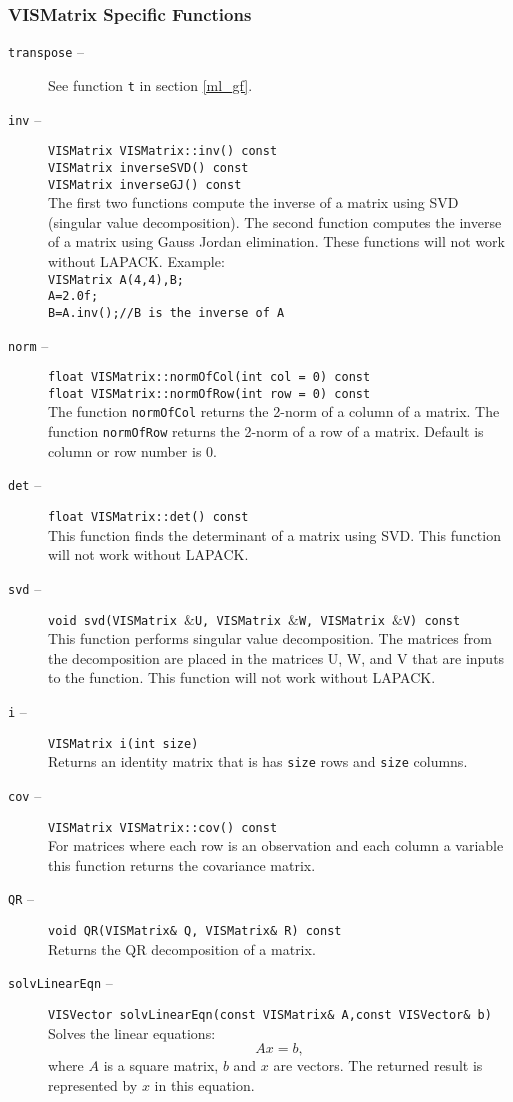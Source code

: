 \subsubsection{VISMatrix Specific Functions}
\label{ml_msf}
\begin{description}
\item[{\tt transpose} --] See function {\tt t} in section \ref{ml_gf}.
\item[{\tt inv} --]
{\tt VISMatrix VISMatrix::inv() const}\\
{\tt VISMatrix inverseSVD() const}\\
{\tt VISMatrix inverseGJ() const}\\
The first two functions compute the inverse of a matrix using SVD
(singular value decomposition).
The second function computes the inverse of a matrix using Gauss Jordan
elimination.
These functions will not work without LAPACK.
Example:\\
{\tt VISMatrix A(4,4),B;}\\
{\tt A=2.0f;}\\
{\tt B=A.inv();//B is the inverse of A}
\item[{\tt norm} --]
{\tt float VISMatrix::normOfCol(int col = 0) const}\\
{\tt float VISMatrix::normOfRow(int row = 0) const}\\
The function {\tt normOfCol} returns the 2-norm of a column of a matrix.
The function {\tt normOfRow} returns the 2-norm of a row of a matrix.
Default is column or row number is 0.
\item[{\tt det} --]
{\tt float VISMatrix::det() const}\\
This function finds the determinant of a matrix using SVD.
This function will not work without LAPACK.
\item[{\tt svd} --]
{\tt void svd(VISMatrix $\&$U, VISMatrix $\&$W, VISMatrix $\&$V) const}\\
This function performs singular value decomposition.
The matrices from the decomposition are placed in the
matrices U, W, and V that are inputs to the function.
This function will not work without LAPACK.
\item[{\tt i} --]
{\tt VISMatrix i(int size)}\\
Returns an identity matrix that is has {\tt size} rows and {\tt size} columns.
\item[{\tt cov} --] 
{\tt VISMatrix VISMatrix::cov() const}\\
For matrices where each row is an observation and each column
a variable this function returns the covariance matrix.
\item[{\tt QR} --]
{\tt void QR(VISMatrix\& Q, VISMatrix\& R) const}\\
Returns the QR decomposition of a matrix.
\item[{\tt solvLinearEqn} --]
{\tt VISVector solvLinearEqn(const VISMatrix\& A,const VISVector\& b)}\\
Solves the linear equations:
\begin{equation}
Ax=b,
\end{equation}
where $A$ is a square matrix, $b$ and $x$ are vectors.
The returned result is represented by $x$ in this equation.
\end{description}

